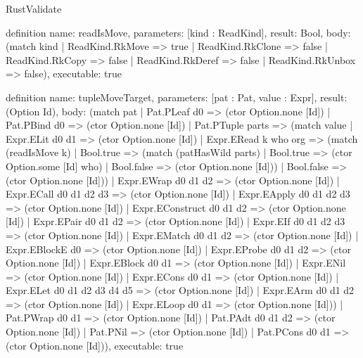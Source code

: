 \begin{lexlean}{RustValidate}
\begin{semanticmodule}
definition{
  name: readIsMove,
  parameters: [kind : ReadKind],
  result: Bool,
  body: (match kind
    | ReadKind.RkMove => true
    | ReadKind.RkClone => false
    | ReadKind.RkCopy => false
    | ReadKind.RkDeref => false
    | ReadKind.RkUnbox => false),
  executable: true
}

definition{
  name: tupleMoveTarget,
  parameters: [pat : Pat, value : Expr],
  result: (Option Id),
  body: (match pat
    | Pat.PLeaf d0 => (ctor Option.none [Id])
    | Pat.PBind d0 => (ctor Option.none [Id])
    | Pat.PTuple parts => (match value
      | Expr.ELit d0 d1 => (ctor Option.none [Id])
      | Expr.ERead k who org => (match (readIsMove k)
        | Bool.true => (match (patHasWild parts)
          | Bool.true => (ctor Option.some [Id] who)
          | Bool.false => (ctor Option.none [Id]))
        | Bool.false => (ctor Option.none [Id]))
      | Expr.EWrap d0 d1 d2 => (ctor Option.none [Id])
      | Expr.ECall d0 d1 d2 d3 => (ctor Option.none [Id])
      | Expr.EApply d0 d1 d2 d3 => (ctor Option.none [Id])
      | Expr.EConstruct d0 d1 d2 => (ctor Option.none [Id])
      | Expr.EPair d0 d1 d2 => (ctor Option.none [Id])
      | Expr.EIf d0 d1 d2 d3 => (ctor Option.none [Id])
      | Expr.EMatch d0 d1 d2 => (ctor Option.none [Id])
      | Expr.EBlockE d0 => (ctor Option.none [Id])
      | Expr.EProbe d0 d1 d2 => (ctor Option.none [Id])
      | Expr.EBlock d0 d1 => (ctor Option.none [Id])
      | Expr.ENil => (ctor Option.none [Id])
      | Expr.ECons d0 d1 => (ctor Option.none [Id])
      | Expr.ELet d0 d1 d2 d3 d4 d5 => (ctor Option.none [Id])
      | Expr.EArm d0 d1 d2 => (ctor Option.none [Id])
      | Expr.ELoop d0 d1 => (ctor Option.none [Id]))
    | Pat.PWrap d0 d1 => (ctor Option.none [Id])
    | Pat.PAdt d0 d1 d2 => (ctor Option.none [Id])
    | Pat.PNil => (ctor Option.none [Id])
    | Pat.PCons d0 d1 => (ctor Option.none [Id])),
  executable: true
}


\end{semanticmodule}
\end{lexlean}
